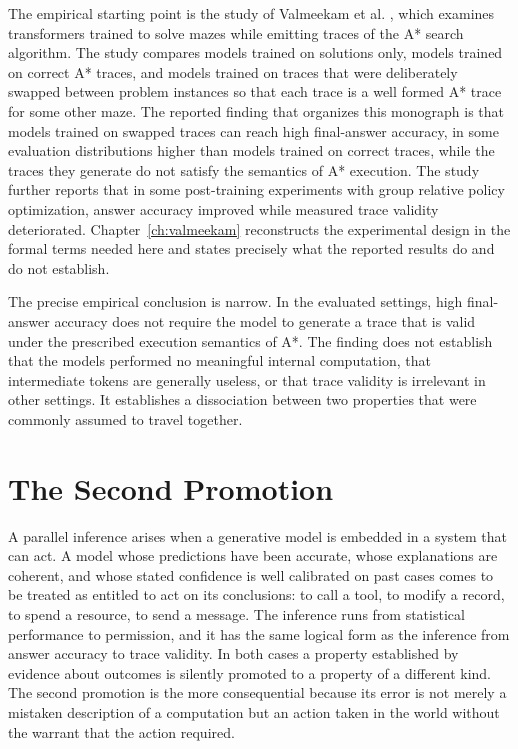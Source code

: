 The empirical starting point is the study of Valmeekam et al. \cite{valmeekam2026}, which examines transformers trained to solve mazes while emitting traces of the A* search algorithm. The study compares models trained on solutions only, models trained on correct A* traces, and models trained on traces that were deliberately swapped between problem instances so that each trace is a well formed A* trace for some other maze. The reported finding that organizes this monograph is that models trained on swapped traces can reach high final-answer accuracy, in some evaluation distributions higher than models trained on correct traces, while the traces they generate do not satisfy the semantics of A* execution. The study further reports that in some post-training experiments with group relative policy optimization, answer accuracy improved while measured trace validity deteriorated. Chapter~\ref{ch:valmeekam} reconstructs the experimental design in the formal terms needed here and states precisely what the reported results do and do not establish.

The precise empirical conclusion is narrow. In the evaluated settings, high final-answer accuracy does not require the model to generate a trace that is valid under the prescribed execution semantics of A*. The finding does not establish that the models performed no meaningful internal computation, that intermediate tokens are generally useless, or that trace validity is irrelevant in other settings. It establishes a dissociation between two properties that were commonly assumed to travel together.

\section{The Second Promotion}

A parallel inference arises when a generative model is embedded in a system that can act. A model whose predictions have been accurate, whose explanations are coherent, and whose stated confidence is well calibrated on past cases comes to be treated as entitled to act on its conclusions: to call a tool, to modify a record, to spend a resource, to send a message. The inference runs from statistical performance to permission, and it has the same logical form as the inference from answer accuracy to trace validity. In both cases a property established by evidence about outcomes is silently promoted to a property of a different kind. The second promotion is the more consequential because its error is not merely a mistaken description of a computation but an action taken in the world without the warrant that the action required.

